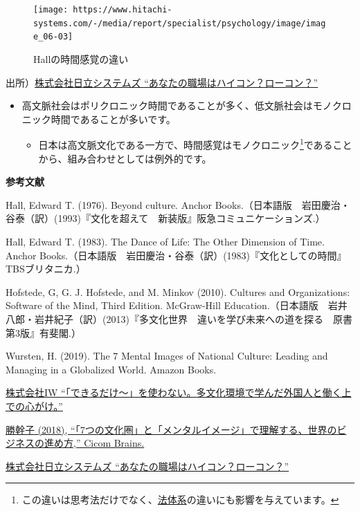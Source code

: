 \documentclass[
]{book}
\providecommand{\tightlist}{%
  \setlength{\itemsep}{0pt}\setlength{\parskip}{0pt}}
\begin{document}
\begin{figure}
\texttt{[image: https://www.hitachi-systems.com/-/media/report/specialist/psychology/image/image\_06-03]} \caption{Hallの時間感覚の違い}\label{fig:hallb}
\end{figure}

出所）\href{https://www.hitachi-systems.com/report/specialist/psychology/06.html}{株式会社日立システムズ ``あなたの職場はハイコン？ローコン？''}

\begin{itemize}
\item
  高文脈社会はポリクロニック時間であることが多く、低文脈社会はモノクロニック時間であることが多いです。

  \begin{itemize}
  \tightlist
  \item
    日本は高文脈文化である一方で、時間感覚はモノクロニック\footnote{この違いは思考法だけでなく、\protect\hyperlink{law}{法体系}の違いにも影響を与えています。}であることから、組み合わせとしては例外的です。
  \end{itemize}
\end{itemize}

{\textbf{参考文献}}

Hall, Edward T. (1976). Beyond culture. Anchor Books.（日本語版　岩田慶治・谷泰（訳）(1993)『文化を超えて　新装版』阪急コミュニケーションズ.）

Hall, Edward T. (1983). The Dance of Life: The Other Dimension of Time. Anchor Books.（日本語版　岩田慶治・谷泰（訳）(1983)『文化としての時間』TBSブリタニカ.）

Hofstede, G, G. J. Hofstede, and M. Minkov (2010). Cultures and Organizations: Software of the Mind, Third Edition. McGraw-Hill Education.（日本語版　岩井八郎・岩井紀子（訳）(2013)『多文化世界　違いを学び未来への道を探る　原書第3版』有斐閣.）

Wursten, H. (2019). The 7 Mental Images of National Culture: Leading and Managing in a Globalized World. Amazon Books.

\href{https://iw-inc.jp/2019/11/09/multienvironment01/}{株式会社IW ``「できるだけ〜」を使わない。多文化環境で学んだ外国人と働く上での心がけ。''}

\href{https://www.cicombrains.com/opinions/02/02-181106mk.html}{勝幹子 (2018), ``｢7つの文化圏」と「メンタルイメージ」で理解する、世界のビジネスの進め方,'' Cicom Brains.}

\href{https://www.hitachi-systems.com/report/specialist/psychology/06.html}{株式会社日立システムズ ``あなたの職場はハイコン？ローコン？''}
\end{document}

